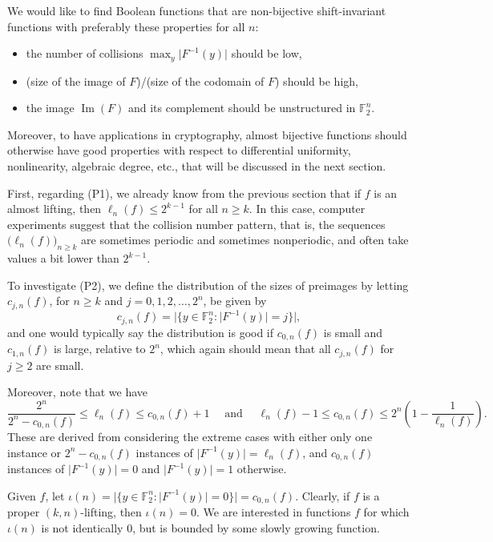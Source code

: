 \documentclass[11pt,english,a4paper]{amsart}
\theoremstyle{plain}
\theoremstyle{definition}
\theoremstyle{remark}
\newcommand{\F}{\mathbb{F}}
\begin{document}
	We would like to find Boolean functions that are non-bijective shift-invariant functions with preferably these properties for all $n$:
	\begin{itemize}
	\item[(P1)] the number of collisions $\max_y \lvert F^{-1}(y)\rvert$ should be low,
	\item[(P2)] (size of the image of $F$)/(size of the codomain of $F$) should be high,
	\item[(P3)] the image $\operatorname{Im}(F)$ and its complement should be unstructured in $\F_2^n$.
	\end{itemize}


	Moreover, to have applications in cryptography, almost bijective functions should otherwise have good properties with respect to differential uniformity, nonlinearity, algebraic degree, etc., that will be discussed in the next section.
	
	First, regarding (P1), we already know from the previous section that if $f$ is an almost lifting, then $\ell_n(f)\leq 2^{k-1}$ for all $n\geq k$. In this case, computer experiments suggest that the collision number pattern, that is, the sequences $\big(\ell_n(f)\big)_{n\geq k}$ are sometimes periodic and sometimes nonperiodic, and often take values a bit lower than $2^{k-1}$.
	
	\medskip
	
	To investigate (P2), we define the distribution of the sizes of preimages by letting $c_{j,n}(f)$, for $n\geq k$ and $j=0,1,2,\dotsc,2^n$, be given by
	\[
	c_{j,n}(f) = \Big\lvert \{ y\in\F_2^n : \lvert F^{-1}(y)\rvert = j \} \Big\rvert,
	\]
	and one would typically say the distribution is good if $c_{0,n}(f)$ is small and $c_{1,n}(f)$ is large, relative to $2^n$, which again should mean that all $c_{j,n}(f)$ for $j\geq 2$ are small.
	
	Moreover, note that we have
	\[
	\frac{2^n}{2^n-c_{0,n}(f)} \leq \ell_n(f) \leq c_{0,n}(f) + 1
	\quad\text{ and }\quad
	\ell_n(f) -1 \leq c_{0,n}(f) \leq 2^n\left(1-\frac{1}{\ell_n(f)}\right).
	\]
	These are derived from considering the extreme cases with either only one instance or $2^n-c_{0,n}(f)$ instances of $\lvert F^{-1}(y)\rvert = \ell_n(f)$, and $c_{0,n}(f)$ instances of $\lvert F^{-1}(y)\rvert = 0$ and $\lvert F^{-1}(y)\rvert = 1$ otherwise.
	
	Given $f$, let $\iota(n)=\Big\lvert \{ y\in\F_2^n : \lvert F^{-1}(y)\rvert = 0 \} \Big\rvert=c_{0,n}(f)$. Clearly, if $f$ is a proper $(k, n)$-lifting, then $\iota(n)=0$. We are interested in functions $f$ for which $\iota(n)$ is not identically 0, but is bounded by some slowly growing function.
	
\end{document}
